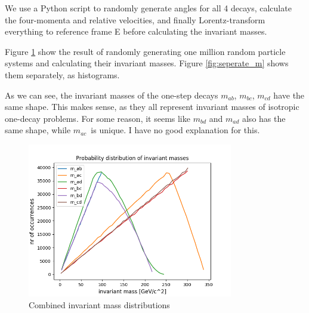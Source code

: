 \documentclass[12p,a4paper]{article}
\begin{document}
We use a Python script to randomly generate angles for all 4 decays, calculate the four-momenta and relative velocities, and finally Lorentz-transform everything to reference frame E before calculating the invariant masses.

Figure \ref{fig:all_m} show the result of randomly generating one million random particle systems and calculating their invariant masses. Figure \ref{fig:seperate_m} shows them separately, as histograms.

As we can see, the invariant masses of the one-step decays $m_{ab}$, $m_{bc}$, $m_{cd}$ have the same shape. This makes sense, as they all represent invariant masses of isotropic one-decay problems. For some reason, it seems like $m_{bd}$ and $m_{ad}$ also has the same shape, while $m_{ac}$ is unique. I have no good explanation for this.

\begin{figure}[H]
    \centering
    \includegraphics[width=0.8\textwidth]{fig/all_m.png}
    \caption{Combined invariant mass distributions}
    \label{fig:all_m}
\end{figure}
\end{document}
